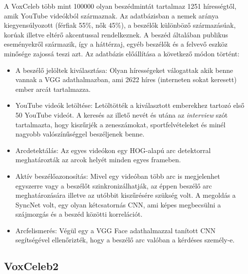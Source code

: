 \bigskip
A VoxCeleb több mint 100000 olyan beszédmintát tartalmaz 1251 hírességtől, amik YouTube videókból származnak. Az adatbázisban a nemek aránya kiegyensúlyozott (férfiak 55\%, nők 45\%), a beszélők különböző származásúak, korúak illetve eltérő akcentussal rendelkeznek. A beszéd általában publikus eseményekről származik, így a háttérzaj, egyéb beszélők és a felvevő eszköz minősége zajossá teszi azt.
\newline
\newline
Az adatbázis előállítása a következő módon történt:
\begin{itemize}
	\item A beszélő jelöltek kiválasztása:  Olyan hírességeket válogattak akik benne vannak a VGG adathalmazban, ami 2622 híres (interneten sokat keresett) ember arcát tartalmazza.
	\item YouTube videók letöltése: Letöltötték a kiválasztott emberekhez tartozó első 50 YouTube videót. A keresés az illető nevét és utána az \emph{interview} szót tartalmazta, hogy kiszűrjék a zeneszámokat, sportfelvételeket és minél nagyobb valószínűséggel beszéljenek benne.
	\item Arcdetektálás: Az egyes videókon egy HOG-alapú arc detektorral meghatározták az arcok helyét minden egyes frameben.
	\item Aktív beszélőazonosítás: Mivel egy videóban több arc is megjelenhet egyszerre vagy a beszélőt szinkronizálhatják, az éppen beszélő arc meghatározására illetve az utóbbit kiszűrésére szükség volt. A megoldás a SyncNet volt, egy olyan kétcsatornás CNN, ami képes megbecsülni a szájmozgás és a beszéd közötti korrelációt.
	\item Arcfelismerés: Végül egy a VGG Face adathalmazzal tanított CNN segítségével ellenőrizték, hogy a beszélő arc valóban a kérdéses személy-e.
\end{itemize}

\subsection{VoxCeleb2}

